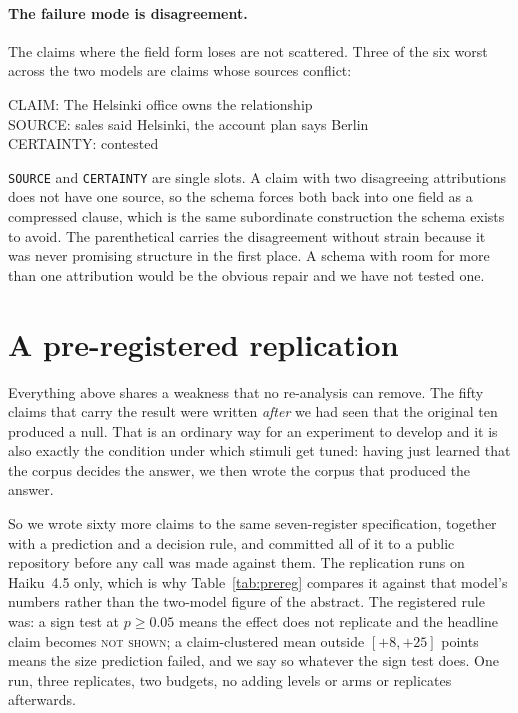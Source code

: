 \documentclass[11pt]{article}
\begin{document}
\paragraph{The failure mode is disagreement.} The claims where the field form loses are
not scattered. Three of the six worst across the two models are claims whose sources
conflict:

\begin{promptbox}
CLAIM: The Helsinki office owns the relationship\\
SOURCE: sales said Helsinki, the account plan says Berlin\\
CERTAINTY: contested
\end{promptbox}

\noindent \texttt{SOURCE} and \texttt{CERTAINTY} are single slots. A claim with two
disagreeing attributions does not have one source, so the schema forces both back into
one field as a compressed clause, which is the same subordinate construction the schema
exists to avoid. The parenthetical carries the disagreement without strain because it was
never promising structure in the first place. A schema with room for more than one
attribution would be the obvious repair and we have not tested one.

\section{A pre-registered replication}
\label{sec:prereg}

Everything above shares a weakness that no re-analysis can remove. The fifty claims that
carry the result were written \emph{after} we had seen that the original ten produced a
null. That is an ordinary way for an experiment to develop and it is also exactly the
condition under which stimuli get tuned: having just learned that the corpus decides the
answer, we then wrote the corpus that produced the answer.

So we wrote sixty more claims to the same seven-register specification, together with a
prediction and a decision rule, and committed all of it to a public repository before any
call was made against them. The replication runs on Haiku~4.5 only, which is why
Table~\ref{tab:prereg} compares it against that model's numbers rather than the two-model
figure of the abstract. The registered rule was: a sign test at $p \ge 0.05$ means
the effect does not replicate and the headline claim becomes \textsc{not shown}; a
claim-clustered mean outside $[+8, +25]$ points means the size prediction failed, and we
say so whatever the sign test does. One run, three replicates, two budgets, no adding
levels or arms or replicates afterwards.
\end{document}
